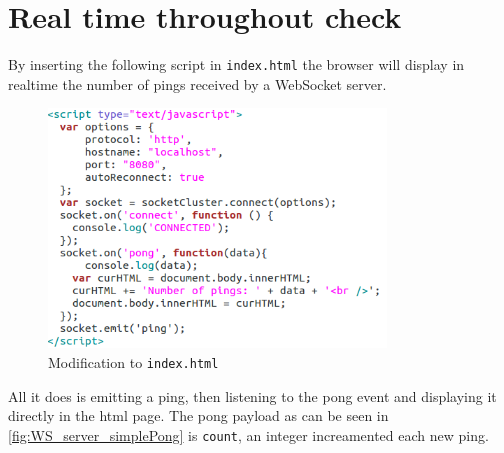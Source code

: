 \chapter{Real time throughout check}
\label{indexHTML}

By inserting the following script in \texttt{index.html} the browser will
display in realtime the number of pings received by a WebSocket server.

\begin{figure}[H] \centering
  \includegraphics[width=0.8\textwidth]{./Figures/index_script.png}
\caption[index_script]{Modification to \texttt{index.html}}
\label{fig:index_script} \end{figure}

All it does is emitting a ping, then listening to the pong event and displaying
it directly in the html page. The pong payload as can be seen in
\ref{fig:WS_server_simplePong} is \texttt{count}, an integer increamented each
new ping.
